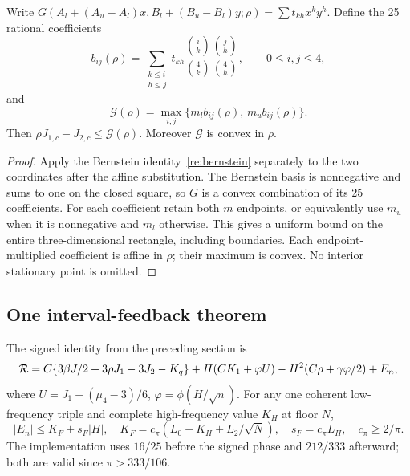 \begin{lemma}\label{entry201:central}
Write $G(A_l+(A_u-A_l)x,B_l+(B_u-B_l)y;\rho)
=\sum t_{kh}x^ky^h$. Define the 25 rational coefficients
\[
 b_{ij}(\rho)=\sum_{\substack{k\le i\\h\le j}}
 t_{kh}\frac{\binom{i}{k}}{\binom4k}
          \frac{\binom{j}{h}}{\binom4h},\qquad 0\le i,j\le4,
\]
and
\[
 \mathcal G(\rho)=\max_{i,j}
       \{m_l b_{ij}(\rho),\,m_u b_{ij}(\rho)\}.
\]
Then $\rho J_{1,c}-J_{2,c}\le\mathcal G(\rho)$.
Moreover $\mathcal G$ is convex in $\rho$.
\end{lemma}
\begin{proof}
Apply the Bernstein identity~\eqref{re:bernstein} separately to the
two coordinates after the affine substitution. The Bernstein basis is nonnegative and sums to one on the closed square,
so $G$ is a convex combination of its 25 coefficients.
For each coefficient retain both $m$ endpoints, or equivalently use
$m_u$ when it is nonnegative and $m_l$ otherwise. This gives a uniform
bound on the entire three-dimensional rectangle, including boundaries.
Each endpoint-multiplied coefficient is affine in $\rho$; their maximum
is convex. No interior stationary point is omitted.
\end{proof}

\subsection{One interval-feedback theorem}
\label{entry:feedback}\label{fourier:uniform}

The signed identity from the preceding section is
\begin{equation}\label{entry:remainder}
 \mathcal R=C\{3\beta J/2+3\rho J_1-3J_2-K_q\}
 +H(CK_1+\varphi U)-H^2(C\rho+\gamma\varphi/2)+E_n,
\end{equation}
where $U=J_1+(\mu_4-3)/6$, $\varphi=\phi(H/\sqrt n)$.
For any one coherent low-frequency triple and complete high-frequency value $K_H$ at floor $N$,
\begin{equation}\label{entry:fourier-budget}
 |E_n|\le K_F+s_F|H|,\quad
 K_F=c_\pi(L_0+K_H+L_2/\sqrt N),\quad s_F=c_\pi L_H,\quad c_\pi\ge2/\pi.
\end{equation}
The implementation uses $16/25$ before the signed phase and $212/333$
afterward; both are valid since $\pi>333/106$.

